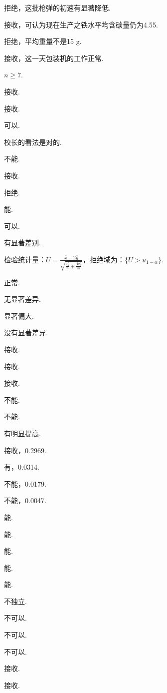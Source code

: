 \begin{answer}
  \item 拒绝，这批枪弹的初速有显著降低.
  \item 接收，可认为现在生产之铁水平均含碳量仍为4.55.
  \item 拒绝，平均重量不是15 g.
  \item 接收，这一天包装机的工作正常.
  \item $n\ge7$.
  \item \begin{enumerate*}
    \item 接收.
    \item 接收.
  \end{enumerate*}
  \item 可以.
  \item 校长的看法是对的.
  \item 不能.
  \item 接收.
  \item 拒绝.
  \item 能.
  \item 可以.
  \item 有显著差别.
  \item 检验统计量：$U=\frac{\bar x-2\bar y}{\sqrt{\frac{\sigma_1^2}n+\frac{4\sigma_2^2}m}}$，拒绝域为：$\{U>u_{1-\alpha}\}$.
  \item 正常.
  \item 无显著差异.
  \item 显著偏大.
  \item 没有显著差异.
  \item 接收.
  \item \begin{enumerate*}
    \item 接收.
    \item 接收.
  \end{enumerate*}
  \item 不能.
\end{answer}

\begin{answer}
  \item 不能.
  \item 有明显提高.
  \item 接收，0.2969.
  \item 有，0.0314.
  \item 不能，0.0179.
  \item 不能，0.0047.
\end{answer}

\begin{answer}
  \item 能.
  \item 能.
  \item 能.
  \item 能.
  \item 能.
  \item 不独立.
  \item 不可以.
  \item 不可以.
  \item 不可以.
  \item 接收.
  \item 接收.
\end{answer}

